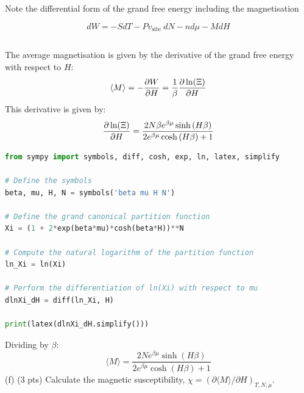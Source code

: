 \documentclass[10pt]{article}
\begin{document}
Note the differential form of the grand free energy including the magnetisation

$$
d W=-S d T-P v_{\text {site }} d N-n d \mu-M d H
$$
\subsection{}
The average magnetisation is given by the derivative of the grand free energy with respect to $H$:
\begin{equation}
  \langle M \rangle = -\pdv{W}{H} = \frac{1}{\beta } \pdv{\ln(\Xi)}{H}
\end{equation}
This derivative is given by:
\begin{equation}
  \pdv{\ln(\Xi)}{H} = \frac{2 N \beta e^{\beta \mu} \sinh{\left(H \beta \right)}}{2 e^{\beta \mu} \cosh{\left(H \beta \right)} + 1}
\end{equation}
\begin{lstlisting}[language=Python]
from sympy import symbols, diff, cosh, exp, ln, latex, simplify

# Define the symbols
beta, mu, H, N = symbols('beta mu H N')

# Define the grand canonical partition function
Xi = (1 + 2*exp(beta*mu)*cosh(beta*H))**N

# Compute the natural logarithm of the partition function
ln_Xi = ln(Xi)

# Perform the differentiation of ln(Xi) with respect to mu
dlnXi_dH = diff(ln_Xi, H)

print(latex(dlnXi_dH.simplify()))

\end{lstlisting}
Dividing by $\beta$:
\begin{equation}
  \langle M \rangle = \frac{2N e^{\beta \mu} \sinh{\left(H \beta \right)}}{2 e^{\beta \mu} \cosh{\left(H \beta \right)} + 1}
\end{equation}
(f) (3 pts) Calculate the magnetic susceptibility, $\chi=(\partial\langle M\rangle / \partial H)_{T, N, \mu}$.
\end{document}
